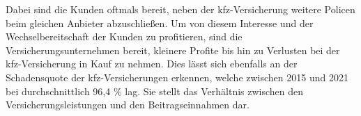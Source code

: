 Dabei sind die Kunden oftmals bereit, neben der \ac{kfz}-Versicherung weitere Policen beim gleichen Anbieter abzuschließen. Um von diesem Interesse und der Wechselbereitschaft der Kunden zu profitieren, sind die Versicherungsunternehmen bereit, kleinere Profite bis hin zu Verlusten bei der \ac{kfz}-Versicherung in Kauf zu nehmen.\autocite[Vgl.][]{HARTUNG2019} Dies lässt sich ebenfalls an der Schadensquote der \ac{kfz}-Versicherungen erkennen, welche zwischen 2015 und 2021 bei durchschnittlich 96,4 \% lag. Sie stellt das Verhältnis zwischen den Versicherungsleistungen und den Beitragseinnahmen dar.\autocite[Vgl.][]{GDVKFZ}  



\newpage
